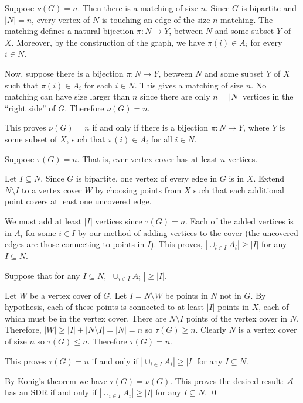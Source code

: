 \documentclass[10pt]{article}
\begin{document}
\begin{solution}
\vspace{1em}

Suppose \( \nu(G) = n \). Then there is a matching of size \( n \). Since \( G \) is bipartite and \( |N| = n \), every vertex of \( N \) is touching an edge of the size \( n \) matching. The matching defines a natural bijection \( \pi:N\to Y \), between \( N \) and some subset \( Y \) of \( X \). Moreover, by the construction of the graph, we have \( \pi(i) \in A_i \) for every \( i\in N \). 

Now, suppose there is a bijection \( \pi:N\to Y \), between \( N \) and some subset \( Y \) of \( X \) such that \( \pi(i) \in A_i \) for each \( i\in N \). This gives a matching of size \( n \). No matching can have size larger than \( n \) since there are only \( n = |N| \) vertices in the ``right side'' of \( G \). Therefore \( \nu(G) = n \).

This proves \( \nu(G) = n \) if and only if there is a bijection \( \pi: N \to Y \), where \( Y \) is some subset of \( X \), such that \( \pi(i) \in A_i \) for all \( i\in N \).

\vspace{1em}

Suppose \( \tau(G) = n \). That is, ever vertex cover has at least \( n \) vertices. 

Let \( I \subseteq N \). Since \( G \) is bipartite, one vertex of every edge in \( G \) is in \( X \).
Extend \( N\setminus I \) to a vertex cover \( W \) by choosing points from \( X \) such that each additional point covers at least one uncovered edge.

We must add at least \( |I| \) vertices since \( \tau(G) = n \). Each of the added vertices is in \( A_i \) for some \( i\in I \) by our method of adding vertices to the cover (the uncovered edges are those connecting to points in \( I \)). This proves, \( \left| \cup_{i\in I} A_i \right| \geq |I| \) for any \( I\subseteq N \).


Suppose that for any \( I\subseteq N \), \( \left| \cup_{i\in I} A_i| \right| \geq |I| \). 

Let \( W \) be a vertex cover of \( G \). Let \( I = N\setminus W \) be points in \( N \) not in \( G \). By hypothesis, each of these points is connected to at least \( |I| \) points in \( X \), each of which must be in the vertex cover. There are \( N\setminus I \) points of the vertex cover in \( N \). Therefore, \( |W| \geq |I| + |N\setminus I| = |N| = n \) so \( \tau(G) \geq n \). 
Clearly \( N \) is a vertex cover of size \( n \) so \( \tau(G) \leq n \). Therefore \( \tau(G) = n \).

This proves \( \tau(G) = n \) if and only if \( |\cup_{i\in I} A_i | \geq |I| \) for any \( I\subseteq N \).

\vspace{1em}

By Konig's theorem we have \( \tau(G) = \nu(G) \). This proves the desired result: \( \mathcal{A} \) has an SDR if and only if \( |\cup_{i\in I} A_i | \geq |I| \) for any \( I\subseteq N \). \qed


\end{solution}
\end{document}
